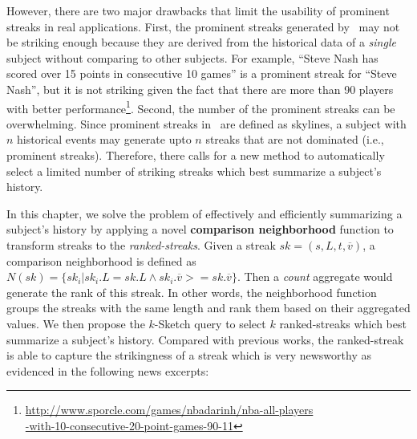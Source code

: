 %
However, there are two major drawbacks that limit the usability
of prominent streaks in real applications.
First, the prominent streaks generated by~\cite{zhang2014discovering} may not be striking enough because they are derived from the historical data of a \emph{single} subject without comparing to other subjects.
For example, 
``Steve Nash has scored over 15 points in consecutive 10 games'' is a prominent streak for ``Steve Nash'', but it is not striking given the fact that there are more than 90 players with better performance\footnote{\url{http://www.sporcle.com/games/nbadarinh/nba-all-players} \\ \url{-with-10-consecutive-20-point-games-90-11}}. 
Second, the number of the prominent streaks can be overwhelming. 
Since prominent streaks in~\cite{zhang2014discovering} are defined as skylines,
a subject with $n$ historical events may generate upto $n$ streaks that are not dominated (i.e., prominent streaks).
Therefore, there calls for a new method to automatically select a limited number of striking streaks which best summarize a subject's history.

In this chapter, we solve the problem of effectively and efficiently 
summarizing a subject's history by
applying a novel \textbf{comparison neighborhood} function to transform streaks to the \emph{ranked-streaks}. 
Given a streak $sk=(s,L,t,\overline{v})$, a comparison neighborhood is defined as $N(sk) = \{sk_i | sk_i.L = sk.L \wedge sk_i.\overline{v} >= sk.\overline{v}\}$. Then a \emph{count} aggregate 
would generate the rank of this streak. In other words, the neighborhood function groups 
the streaks with the same length and rank them based on their aggregated values. 
We then propose the $k$-Sketch query to select $k$ ranked-streaks 
which best summarize a subject's history.
Compared with previous works,
the ranked-streak is able to capture the strikingness of a streak 
which is very newsworthy as evidenced in the following news excerpts:

